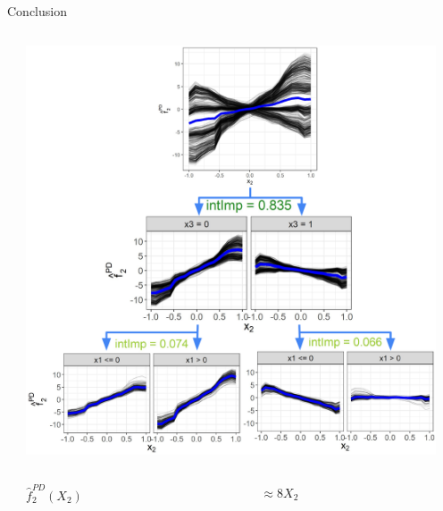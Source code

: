 \documentclass[10pt,compress,t,notes=noshow, xcolor=table]{beamer}
\begin{document}
\begin{frame}{Conclusion}
\begin{columns}[T, totalwidth = \textwidth]
\begin{column}{0.58\textwidth}
    \end{column}
    \begin{column}{0.45\textwidth}
    \centering
    \includegraphics[width=0.95\textwidth]{figure/sim1}
    \vspace{-8pt}
        \begin{columns}[T, totalwidth = \linewidth]
     \footnotesize
            \begin{column}{0.125\linewidth}
            \centering
             $\hat{f}_2^{PD}(X_2)$ %
         \end{column}
         \begin{column}{0.175\linewidth}
         \centering
             $\approx 8X_2$ %

\end{column}
\end{columns}
\end{column}
\end{columns}
\end{frame}
\end{document}
